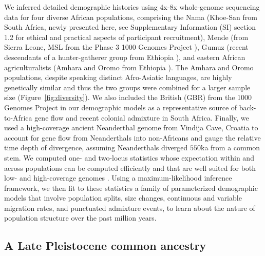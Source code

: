 \documentclass[]{article}
\begin{document}
We inferred detailed demographic histories using 4x-8x whole-genome sequencing
data for four diverse African populations, comprising the Nama (Khoe-San from
South Africa, newly presented here, see Supplementary Information (SI) section
1.2 for ethical and practical aspects of participant recruitment), Mende (from Sierra Leone, MSL from the
Phase 3 1000 Genomes Project \citep{1000_Genomes_Project_Consortium2015-zq}),
Gumuz (recent descendants of a hunter-gatherer group from Ethiopia
\citep{Gurdasani2015-qy,Gopalan2022-pw}), and eastern African agriculturalists
(Amhara and Oromo from Ethiopia \citep{Gurdasani2015-qy}). The Amhara and Oromo
populations, despite speaking distinct Afro-Asiatic languages, are highly
genetically similar \citep{Pagani2015-pz,Gopalan2022-pw} and thus the two
groups were combined for a larger sample size (Figure~\ref{fig:diversity}). We also
included the British (GBR) from the 1000 Genomes Project in our demographic
models as a representative source of back-to-Africa gene flow and recent
colonial admixture in South Africa. Finally, we used a high-coverage ancient
Neanderthal genome from Vindija Cave, Croatia \citep{Prufer2017-kk} to account
for gene flow from Neanderthals into non-Africans and gauge the relative
time depth of divergence, assuming Neanderthals diverged $550$ka from a common
stem. We computed one- and two-locus statistics whose expectation within and across 
populations can be computed efficiently and that are well suited for both low- and
high-coverage genomes \citep{Ragsdale2019-nt,Ragsdale2020-nz}. Using a
maximum-likelihood inference framework, we then fit to these statistics a
family of parameterized demographic models that involve population splits, size
changes, continuous and variable migration rates, and punctuated admixture
events, to learn about the nature of population structure over the past million
years.

  
\subsection*{A Late Pleistocene common ancestry}
\end{document}
